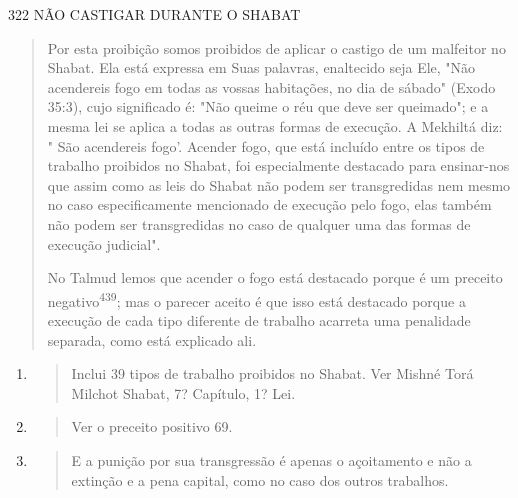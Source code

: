 322 NÃO CASTIGAR DURANTE O SHABAT

\begin{quote}
Por esta proibição somos proibidos de aplicar o castigo de um mal­feitor
no Shabat. Ela está expressa em Suas palavras, enaltecido seja Ele, "Não
acendereis fogo em todas as vossas habitações, no dia de sábado" (Exodo
35:3), cujo significado é: "Não queime o réu que deve ser queimado"; e a
mesma lei se aplica a todas as outras formas de execução. A Mekhiltá
diz: " São acende­reis fogo'. Acender fogo, que está incluído entre os
tipos de trabalho proibidos no Shabat, foi especialmente destacado para
ensinar-nos que assim como as leis do Shabat não podem ser transgredidas
nem mesmo no caso especificamente mencionado de execução pelo fogo, elas
também não podem ser transgredidas no caso de qualquer uma das formas de
execução judicial".

No Talmud lemos que acender o fogo está destacado porque é um preceito
negativo\textsuperscript{439}; mas o parecer aceito é que isso está
destacado porque a execução de cada tipo diferente de trabalho acarreta
uma penalidade separada, como está explicado ali.
\end{quote}

\begin{enumerate}
\def\labelenumi{\arabic{enumi}.}
\setcounter{enumi}{436}
\item
  \begin{quote}
  Inclui 39 tipos de trabalho proibidos no Shabat. Ver Mishné Torá
  Milchot Shabat, 7? Capítu­lo, 1? Lei.
  \end{quote}
\item
  \begin{quote}
  Ver o preceito positivo 69.
  \end{quote}
\item
  \begin{quote}
  E a punição por sua transgressão é apenas o açoitamento e não a
  extinção e a pena capital, como no caso dos outros trabalhos.
  \end{quote}
\end{enumerate}

